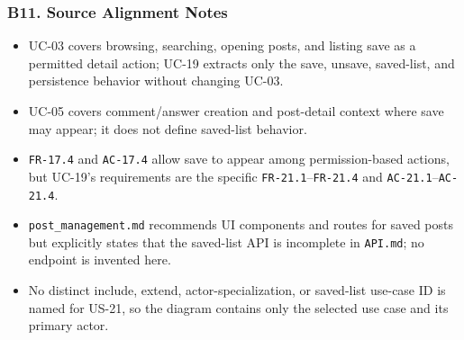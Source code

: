 \documentclass[12pt]{article}
\begin{document}
\subsubsection*{B11. Source Alignment Notes}
\par\medskip

\begin{itemize}
\item UC-03 covers browsing, searching, opening posts, and listing save as a permitted detail action; UC-19 extracts only the save, unsave, saved-list, and persistence behavior without changing UC-03.
\item UC-05 covers comment/answer creation and post-detail context where save may appear; it does not define saved-list behavior.
\item \texttt{FR-17.4} and \texttt{AC-17.4} allow save to appear among permission-based actions, but UC-19's requirements are the specific \texttt{FR-21.1}--\texttt{FR-21.4} and \texttt{AC-21.1}--\texttt{AC-21.4}.
\item \texttt{post\_management.md} recommends UI components and routes for saved posts but explicitly states that the saved-list API is incomplete in \texttt{API.md}; no endpoint is invented here.
\item No distinct include, extend, actor-specialization, or saved-list use-case ID is named for US-21, so the diagram contains only the selected use case and its primary actor.
\end{itemize}
\par\medskip
\end{document}
